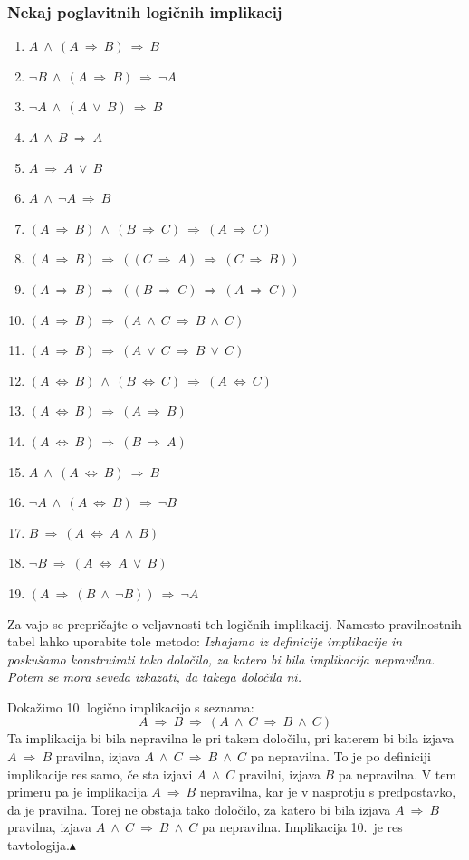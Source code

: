 \documentclass[12pt,a4paper]{article}
\def\ali {{~\vee~}}
\def\inn {{~\wedge~}}
\def\sledi {{~\Rightarrow~}}
\def\cee {{~\Leftrightarrow~}}
\def\zgled{\noindent{\bf\color{blue} Zgled: }}
\def\kz{{\hfill{\color{blue}$\blacktriangle$}}}%
\begin{document}
\subsubsection*{Nekaj poglavitnih logičnih implikacij}

\begin{enumerate}
  \item $A \inn (A \sledi B) \sledi B$
  \item $\neg B \inn (A \sledi B) \sledi \neg A$
  \item $\neg A \inn (A \ali B) \sledi B$
  \item $A \inn B \sledi A$
  \item $A \sledi A\ali B$
  \item $A \inn \neg A\sledi B$
  \item $(A \sledi B) \inn (B \sledi C) \sledi (A\sledi C)$
  \item $(A \sledi B) \sledi ((C \sledi A) \sledi (C\sledi B))$
  \item $(A \sledi B) \sledi ((B \sledi C) \sledi (A\sledi C))$
  \item $(A \sledi B) \sledi (A\inn C \sledi B\inn C)$
  \item $(A \sledi B) \sledi (A\ali C \sledi B\ali C)$
  \item $(A \cee B) \inn (B\cee C) \sledi (A\cee C)$
  \item $(A \cee B) \sledi (A\sledi B)$
  \item $(A \cee B) \sledi (B\sledi A)$
  \item $A \inn (A \cee B) \sledi B$
  \item $\neg A \inn (A \cee B) \sledi \neg B$
  \item $B\sledi (A\cee A \inn B)$
  \item $\neg B\sledi (A\cee A \ali B)$
  \item $(A\sledi (B\inn \neg B)) \sledi \neg A$
\end{enumerate}

Za vajo se prepričajte o veljavnosti teh logičnih implikacij. Namesto pravilnostnih tabel lahko uporabite tole metodo:  {\em Izhajamo iz definicije implikacije in poskušamo konstruirati tako določilo, za katero bi bila implikacija nepravilna. Potem se mora seveda izkazati, da takega določila ni.}

\bigskip
\zgled
Dokažimo 10. logično implikacijo s seznama:
$$A \sledi B \sledi (A\inn C \sledi B\inn C)$$
Ta implikacija bi bila nepravilna le pri takem določilu, pri katerem bi bila izjava
$A \sledi B$ pravilna, izjava $A\inn C \sledi B\inn C$ pa nepravilna. To je po definiciji implikacije res samo, če sta izjavi $A\inn C$ pravilni, izjava $B$ pa nepravilna.
V tem primeru pa je implikacija $A \sledi B$ nepravilna, kar je v nasprotju s predpostavko, da je
pravilna. Torej ne obstaja tako določilo, za katero bi bila izjava  $A \sledi B$ pravilna, izjava $A\inn C \sledi B\inn C$ pa nepravilna. Implikacija 10.~je res tavtologija.\kz
\end{document}
